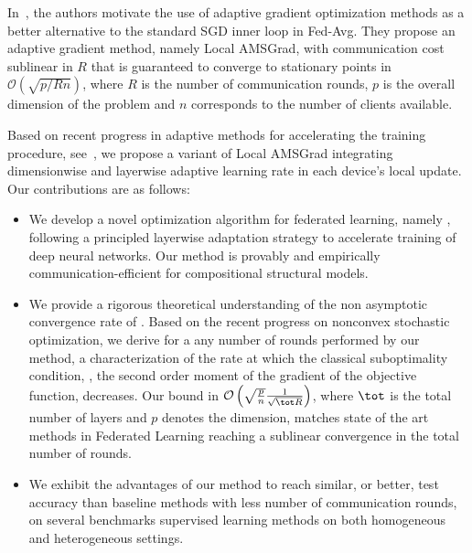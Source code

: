 \documentclass[11pt]{article}
\begin{document}
In~\citep{chen2020toward}, the authors motivate the use of adaptive gradient optimization methods as a better alternative to the standard SGD inner loop in Fed-Avg.
They propose an adaptive gradient method, namely Local AMSGrad, with communication cost sublinear in $R$ that is guaranteed to converge to stationary points in $\mathcal{O}(\sqrt{p/Rn})$, where $R$ is the number of communication rounds, $p$ is the overall dimension of the problem and $n$ corresponds to the number of clients available.

Based on recent progress in adaptive methods for accelerating the training procedure, see~\citep{you2019large}, we propose a variant of Local AMSGrad integrating dimensionwise and layerwise adaptive learning rate in each device's local update.
Our contributions are as follows:
\begin{itemize}
\item We develop a novel optimization algorithm for federated learning, namely \algo, following a principled layerwise adaptation strategy to accelerate training of deep neural networks. Our method is provably and empirically communication-efficient for compositional structural models.
\item We provide a rigorous theoretical understanding of the non asymptotic convergence rate of \algo. 
Based on the recent progress on nonconvex stochastic optimization, we derive for a any number of rounds performed by our method, a characterization of the rate at which the classical suboptimality condition, \ie, the second order moment of the gradient of the objective function, decreases. Our bound  in $\mathcal{O}\left(\sqrt{\frac{ p}{ n}} \frac{1}{\sqrt{\tot R} } \right)$, where $\tot$ is the total number of layers and $p$ denotes the dimension, matches state of the art methods in Federated Learning reaching a sublinear convergence in the total number of rounds.
\item We exhibit the advantages of our method to reach similar, or better, test accuracy than baseline methods with less number of communication rounds, on several benchmarks supervised learning methods on both homogeneous and heterogeneous settings.
\end{itemize}

\end{document}
